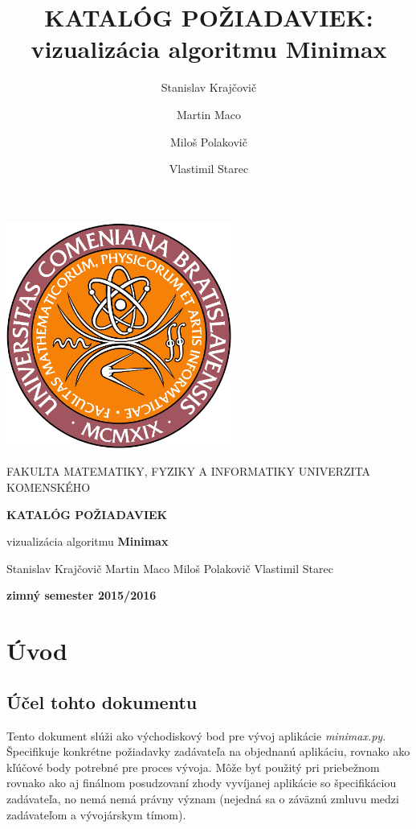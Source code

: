 \documentclass{article}
\title{KATALÓG POŽIADAVIEK: vizualizácia algoritmu Minimax}
\author{Stanislav Krajčovič \and Martin Maco \and Miloš Polakovič \and Vlastimil Starec}
\begin{document}
\begin{titlepage}
	\centering
	\includegraphics[width=20em]{images/fmfi_uk.jpg}
	\par\vspace{0.5cm}
	{\scshape\Large FAKULTA MATEMATIKY, FYZIKY A INFORMATIKY UNIVERZITA KOMENSKÉHO}
	\par\vspace{2cm}
	{\LARGE \textbf{KATALÓG POŽIADAVIEK}}
	\par\vspace{0.2cm}
	{\Large vizualizácia algoritmu \textbf{Minimax}}
	\par\vfill
	Stanislav Krajčovič \quad Martin Maco \quad Miloš Polakovič \quad Vlastimil Starec
	\par\vspace{0.2cm}
	\textbf{zimný semester 2015/2016}
\end{titlepage}

\tableofcontents
\newpage

\section{Úvod}\label{sec:introduction}
\subsection{Účel tohto dokumentu}\label{subsec:aim}
Tento dokument slúži ako východiskový bod pre vývoj aplikácie \emph{minimax.py}. Špecifikuje konkrétne požiadavky zadávateľa na objednanú aplikáciu, rovnako ako kľúčové body potrebné pre proces vývoja. Môže byť použitý pri priebežnom rovnako ako aj finálnom posudzovaní zhody vyvíjanej aplikácie so špecifikáciou zadávateľa, no nemá nemá právny význam (nejedná sa o záväznú zmluvu medzi zadávateľom a vývojárskym tímom).
\end{document}
